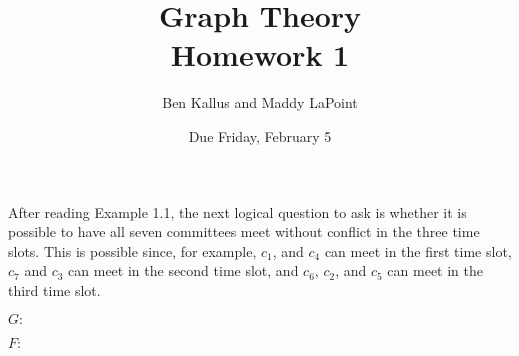 \documentclass[12pt]{article}
\title{Graph Theory \\ Homework 1}
\author{Ben Kallus and Maddy LaPoint}
\date{Due Friday, February 5}
\begin{document}
\pagecolor{black}
\color{white}
\maketitle


    After reading Example 1.1, the next logical question to ask is whether it is possible to have all seven committees meet without conflict in the three time slots.
    This is possible since, for example, $c_1$, and $c_4$ can meet in the first time slot, $c_7$ and $c_3$ can meet in the second time slot, and $c_6$, $c_2$, and $c_5$ can meet in the third time slot.


\bigskip
{}

    $G:$


\newpage
{}
    
    $F:$
    \bigskip

    \newcommand{\cone}{(-.5,-.5)}
    \newcommand{\ctwo}{(1,-4)}
    \newcommand{\cthree}{(-1,-4)}
    \newcommand{\cfour}{(.5,-.5)}
    \newcommand{\cfive}{(-3,-2)}
    \newcommand{\csix}{(-3,0)}
    \newcommand{\cseven}{(.5,-1.5)}
    \newcommand{\ceight}{(-1,2)}
    \newcommand{\cnine}{(1,2)}
    \newcommand{\cten}{(-.5,-1.5)}
    \newcommand{\celeven}{(3,0)}
    \newcommand{\ctwelve}{(3,-2)}
\end{document}
